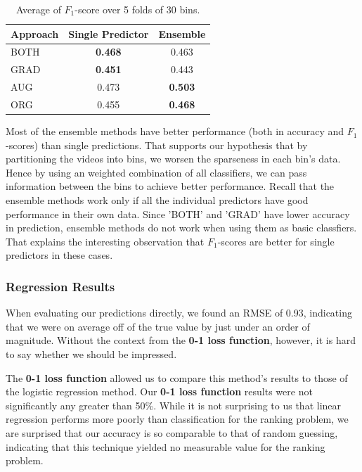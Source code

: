 	\begin{table}[h]
	\caption{Average of $F_1$-score over 5 folds of 30 bins.}
	\label{tbl:f1}
		\begin{center}		
			\begin{tabular}{| l | c | c |}
			\hline
				Approach & Single Predictor & Ensemble \\ \hline
				BOTH & \textbf{0.468} & 0.463 \\ \hline
				GRAD & \textbf{0.451} & 0.443 \\ \hline
				AUG & 0.473 & \textbf{0.503} \\ \hline
				ORG & 0.455 & \textbf{0.468} \\ \hline
			\end{tabular}
		\end{center}
	\end{table}

	Most of the ensemble methods have better performance (both in accuracy and $F_1$-scores) than single predictions. That supports our hypothesis that by partitioning the videos into bins, we worsen the sparseness in each bin's data. Hence by using an weighted combination of all classifiers, we can pass information between the bins to achieve better performance. Recall that the ensemble methods work only if all the individual predictors have good performance in their own data. Since 'BOTH' and 'GRAD' have lower accuracy in prediction, ensemble methods do not work when using them as basic classfiers. That explains the interesting observation that $F_1$-scores are better for single predictors in these cases.
	
\subsubsection{Regression Results}
	When evaluating our predictions directly, we found an RMSE of 0.93, indicating that we were on average off of the true value by just under an order of magnitude.  Without the context from the \textbf{0-1 loss function}, however, it is hard to say whether we should be impressed.
	
	The \textbf{0-1 loss function} allowed us to compare this method's results to those of the logistic regression method.  Our \textbf{0-1 loss function} results were not significantly any greater than 50\%.  While it is not surprising to us that linear regression performs more poorly than classification for the ranking problem, we are surprised that our accuracy is so comparable to that of random guessing, indicating that this technique yielded no measurable value for the ranking problem.
	
